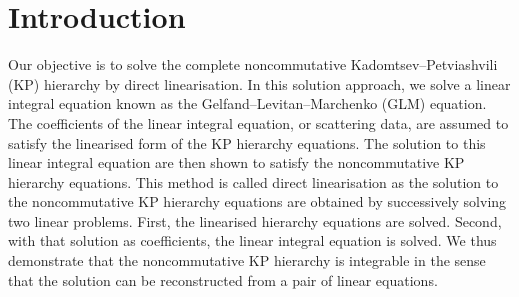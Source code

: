 \documentclass[5p,twocolumn]{elsarticle}
\begin{document}
\section{Introduction}
Our objective is to solve the complete noncommutative Kadomtsev--Petviashvili (KP) hierarchy by direct linearisation. 
In this solution approach, we solve a linear integral equation known as the Gelfand--Levitan--Marchenko (GLM) equation.
The coefficients of the linear integral equation, or scattering data, are assumed to satisfy the linearised form of the KP hierarchy equations. 
The solution to this linear integral equation are then shown to satisfy the noncommutative KP hierarchy equations.
This method is called direct linearisation as the solution to the noncommutative KP hierarchy equations are obtained by successively solving two linear problems.
First, the linearised hierarchy equations are solved. Second, with that solution as coefficients, the linear integral equation is solved.
We thus demonstrate that the noncommutative KP hierarchy is integrable in the sense that the solution can be reconstructed from a pair of linear equations.
\end{document}
